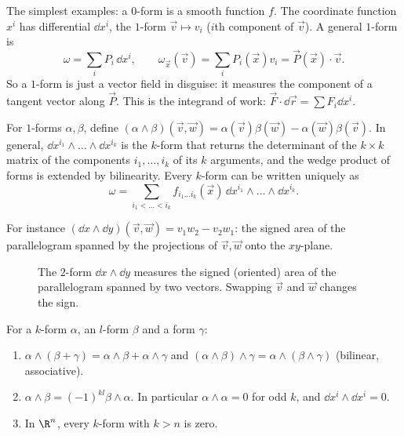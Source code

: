 The simplest examples: a $0$-form is a smooth function $f$. The coordinate function $x^i$ has differential $\dd x^i$, the $1$-form $\vec v\mapsto v_i$ ($i$th component of $\vec v$). A general $1$-form is
\[
\omega=\sum_iP_i\,\dd x^i,\qquad\omega_{\vec x}(\vec v)=\sum_iP_i(\vec x)v_i=\vec P(\vec x)\cdot\vec v .
\]
So a $1$-form is just a vector field in disguise: it measures the component of a tangent vector along $\vec P$. This is the integrand of work: $\vec F\cdot\dd\vec r=\sum F_i\dd x^i$.

\begin{definition}
For $1$-forms $\alpha,\beta$, define $(\alpha\wedge\beta)(\vec v,\vec w)=\alpha(\vec v)\beta(\vec w)-\alpha(\vec w)\beta(\vec v)$. In general, $\dd x^{i_1}\wedge\dots\wedge\dd x^{i_k}$ is the $k$-form that returns the determinant of the $k\times k$ matrix of the components $i_1,\dots,i_k$ of its $k$ arguments, and the wedge product of forms is extended by bilinearity. Every $k$-form can be written uniquely as
\[
\omega=\sum_{i_1<\dots<i_k}f_{i_1\dots i_k}(\vec x)\,\dd x^{i_1}\wedge\dots\wedge\dd x^{i_k}.
\]
\end{definition}

For instance $(\dd x\wedge\dd y)(\vec v,\vec w)=v_1w_2-v_2w_1$: the signed area of the parallelogram spanned by the projections of $\vec v,\vec w$ onto the $xy$-plane.

\begin{figure}[ht]
\centering
{}
\caption{The $2$-form $\dd x\wedge\dd y$ measures the signed (oriented) area of the parallelogram spanned by two vectors. Swapping $\vec v$ and $\vec w$ changes the sign.}
\label{fig:wedgearea}
\end{figure}

\begin{proposition}\label{prop:wedge}
For a $k$-form $\alpha$, an $l$-form $\beta$ and a form $\gamma$:
\begin{enumerate}[label=(\alph*)]
  \item $\alpha\wedge(\beta+\gamma)=\alpha\wedge\beta+\alpha\wedge\gamma$ and $(\alpha\wedge\beta)\wedge\gamma=\alpha\wedge(\beta\wedge\gamma)$ (bilinear, associative).
  \item $\alpha\wedge\beta=(-1)^{kl}\beta\wedge\alpha$. In particular $\alpha\wedge\alpha=0$ for odd $k$, and $\dd x^i\wedge\dd x^i=0$.
  \item In $\R^n$, every $k$-form with $k>n$ is zero.
\end{enumerate}
\end{proposition}

